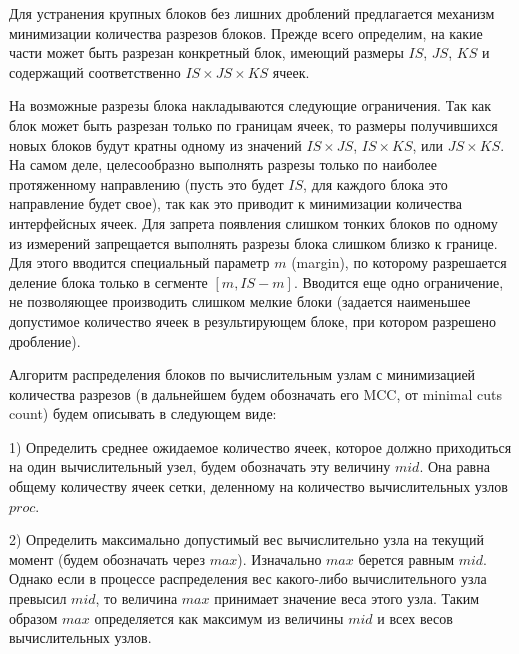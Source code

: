 \documentclass[a4paper,14pt]{extarticle}                     %
\theoremstyle{plain}                                         %
\begin{document}
Для устранения крупных блоков без лишних дроблений предлагается механизм минимизации количества разрезов блоков.
Прежде всего определим, на какие части может быть разрезан конкретный блок, имеющий размеры $IS$, $JS$, $KS$ и содержащий соответственно $IS \times JS \times KS$ ячеек.

На возможные разрезы блока накладываются следующие ограничения.
Так как блок может быть разрезан только по границам ячеек, то размеры получившихся новых блоков будут кратны одному из значений $IS \times JS$, $IS \times KS$, или $JS \times KS$.
На самом деле, целесообразно выполнять разрезы только по наиболее протяженному направлению (пусть это будет $IS$, для каждого блока это направление будет свое), так как это приводит к минимизации количества интерфейсных ячеек.
Для запрета появления слишком тонких блоков по одному из измерений запрещается выполнять разрезы блока слишком близко к границе.
Для этого вводится специальный параметр $m$ (margin), по которому разрешается деление блока только в сегменте $[m, IS - m]$.
Вводится еще одно ограничение, не позволяющее производить слишком мелкие блоки (задается наименьшее допустимое количество ячеек в результирующем блоке, при котором разрешено дробление).

Алгоритм распределения блоков по вычислительным узлам с минимизацией количества разрезов (в дальнейшем будем обозначать его MCC, от minimal cuts count) будем описывать в следующем виде:

1) Определить среднее ожидаемое количество ячеек, которое должно приходиться на один вычислительный узел, будем обозначать эту величину $mid$.
Она равна общему количеству ячеек сетки, деленному на количество вычислительных узлов $proc$.

2) Определить максимально допустимый вес вычислительно узла на текущий момент (будем обозначать через $max$).
Изначально $max$ берется равным $mid$.
Однако если в процессе распределения вес какого-либо вычислительного узла превысил $mid$, то величина $max$ принимает значение веса этого узла.
Таким образом $max$ определяется как максимум из величины $mid$ и всех весов вычислительных узлов.
\end{document}

